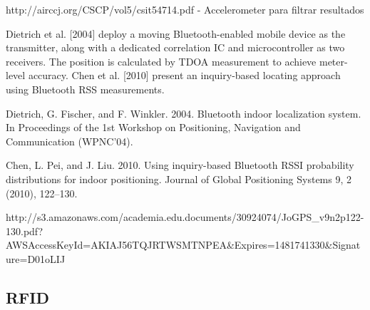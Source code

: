 http://airccj.org/CSCP/vol5/csit54714.pdf - Accelerometer para filtrar resultados




Dietrich et al. [2004] deploy a moving Bluetooth-enabled mobile device as
the transmitter, along with a dedicated correlation IC and microcontroller as two receivers.
The position is calculated by TDOA measurement to achieve meter-level accuracy.
Chen et al. [2010] present an inquiry-based locating approach using Bluetooth
RSS measurements.

Dietrich, G. Fischer, and F. Winkler. 2004. Bluetooth indoor localization system. In Proceedings of the 1st
Workshop on Positioning, Navigation and Communication (WPNC’04).

Chen, L. Pei, and J. Liu. 2010. Using inquiry-based Bluetooth RSSI probability distributions for indoor
positioning. Journal of Global Positioning Systems 9, 2 (2010), 122–130.

http://s3.amazonaws.com/academia.edu.documents/30924074/JoGPS_v9n2p122-130.pdf?AWSAccessKeyId=AKIAJ56TQJRTWSMTNPEA&Expires=1481741330&Signature=D01oLIJ%


\subsection{RFID}
\label{subsec:rfid}
